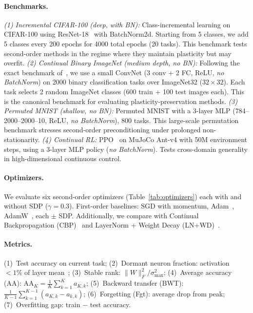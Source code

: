 \documentclass{article}
\begin{document}
\paragraph{Benchmarks.}
\emph{(1) Incremental CIFAR-100 (deep, with BN):} Class-incremental learning on CIFAR-100 using ResNet-18~\citep{he2016deep} with BatchNorm2d. Starting from 5 classes, we add 5 classes every 200 epochs for 4000 total epochs (20 tasks). This benchmark tests second-order methods in the regime where they maintain plasticity but may overfit.
\emph{(2) Continual Binary ImageNet (medium depth, no BN):} Following the exact benchmark of~\citet{dohare2024loss}, we use a small ConvNet (3 conv + 2 FC, ReLU, \emph{no BatchNorm}) on 2000 binary classification tasks over ImageNet32 ($32{\times}32$). Each task selects 2 random ImageNet classes (600 train + 100 test images each). This is the canonical benchmark for evaluating plasticity-preservation methods.
\emph{(3) Permuted MNIST (shallow, no BN):} Permuted MNIST with a 3-layer MLP (784--2000--2000--10, ReLU, \emph{no BatchNorm}), 800 tasks. This large-scale permutation benchmark stresses second-order preconditioning under prolonged non-stationarity.
\emph{(4) Continual RL:} PPO~\citep{schulman2017proximal} on MuJoCo Ant-v4 with 50M environment steps, using a 3-layer MLP policy (\emph{no BatchNorm}). Tests cross-domain generality in high-dimensional continuous control.

\paragraph{Optimizers.} We evaluate six second-order optimizers (Table~\ref{tab:optimizers}) each with and without SDP ($\gamma = 0.3$). First-order baselines: SGD with momentum, Adam~\citep{kingma2015adam}, AdamW~\citep{loshchilov2019adamw}, each $\pm$ SDP. Additionally, we compare with Continual Backpropagation (CBP)~\citep{dohare2024loss} and LayerNorm + Weight Decay (LN+WD)~\citep{lyle2025disentangling}.

\paragraph{Metrics.} (1)~Test accuracy on current task; (2)~Dormant neuron fraction: activation $<1\%$ of layer mean~\citep{sokar2023dormant}; (3)~Stable rank: $\|W\|_F^2 / \sigma_{\max}^2$; (4)~Average accuracy (AA): $\mathrm{AA}_K = \frac{1}{K}\sum_{k=1}^K a_{K,k}$; (5)~Backward transfer (BWT): $\frac{1}{K-1}\sum_{k=1}^{K-1}(a_{K,k} - a_{k,k})$; (6)~Forgetting (Fgt): average drop from peak; (7)~Overfitting gap: train $-$ test accuracy.
\end{document}
